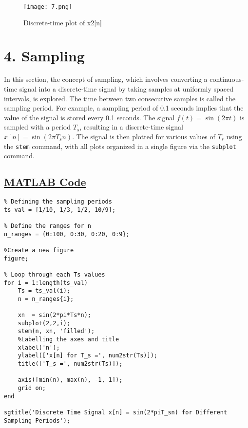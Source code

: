 \documentclass[a4paper,12pt,fleqn]{article}
\begin{document}
\begin{figure}[h]
    \centering
    \texttt{[image: 7.png]}
    \caption{Discrete-time plot of x2[n]}
    \label{fig:enter-label}
\end{figure}
\FloatBarrier
\newpage
\section*{4. Sampling}
In this section, the concept of sampling, which involves converting a continuous-time signal into a discrete-time signal by taking samples at uniformly spaced intervals, is explored. The time between two consecutive samples is called the sampling period. 
For example, a sampling period of 0.1 seconds implies that the value of the signal is stored 
every 0.1 seconds. The signal \( f(t) = \sin(2\pi t) \) is sampled with a period \( T_s \), resulting in a discrete-time signal \( x[n] = \sin(2\pi T_s n) \). The signal is then plotted for various values of \( T_s \) using the \texttt{stem} command, with all plots organized in a single figure via the \texttt{subplot} command.

\subsection*{\underline{MATLAB Code}}
\begin{lstlisting}
% Defining the sampling periods
ts_val = [1/10, 1/3, 1/2, 10/9];

% Define the ranges for n
n_ranges = {0:100, 0:30, 0:20, 0:9};

%Create a new figure
figure;

% Loop through each Ts values
for i = 1:length(ts_val)
    Ts = ts_val(i);
    n = n_ranges{i};

    xn  = sin(2*pi*Ts*n);
    subplot(2,2,i);
    stem(n, xn, 'filled');
    %Labelling the axes and title
    xlabel('n');
    ylabel(['x[n] for T_s =', num2str(Ts)]);
    title(['T_s =', num2str(Ts)]);

    axis([min(n), max(n), -1, 1]);
    grid on;
end

sgtitle('Discrete Time Signal x[n] = sin(2*piT_sn) for Different Sampling Periods');

\end{lstlisting}
\end{document}
